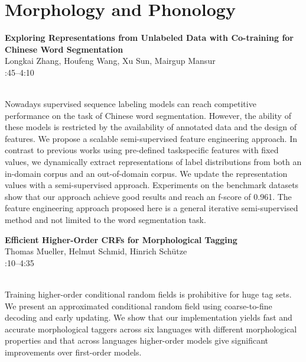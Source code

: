 \documentclass[twoside,makeidx]{book}
\renewcommand{\normalsize}{\fontsize{8}{9}\selectfont}
\renewcommand{\small}{\fontsize{7}{8}\selectfont}
\begin{document}
\section{Morphology and Phonology}
\vspace{-1em}
\par\vspace{2em}\noindent%
\begin{minipage}{\linewidth}%
\begin{center}
\textbf{\normalsize Exploring Representations from Unlabeled Data with Co-training for Chinese Word Segmentation}\\
\normalsize  Longkai Zhang,  Houfeng Wang,  Xu Sun,  Mairgup Mansur\\
{\small 3:45--4:10}\\
\end{center}
\end{minipage}\\[0.5em]
\nopagebreak%
\noindent%
{\small Nowadays supervised sequence labeling models can reach competitive performance on the task of Chinese word segmentation. However, the ability of these models is restricted by the availability of annotated data and the design of features. We propose a scalable semi-supervised feature engineering approach. In contrast to previous works using pre-defined taskspecific features with fixed values, we dynamically extract representations of label distributions from both an in-domain corpus and an out-of-domain corpus. We update the representation values with a semi-supervised approach. Experiments on the benchmark datasets show that our approach achieve good results and reach an f-score of 0.961. The feature engineering approach proposed here is a general iterative semi-supervised method and not limited to the word segmentation task.}
\par\vspace{2em}\noindent%
\begin{minipage}{\linewidth}%
\begin{center}
\textbf{\normalsize Efficient Higher-Order CRFs for Morphological Tagging}\\
\normalsize  Thomas Mueller,  Helmut Schmid,  Hinrich Sch\"{u}tze\\
{\small 4:10--4:35}\\
\end{center}
\end{minipage}\\[0.5em]
\nopagebreak%
\noindent%
{\small Training higher-order conditional random fields is prohibitive for huge tag sets. We present an approximated conditional random field using coarse-to-fine decoding and early updating. We show that our implementation yields fast and accurate morphological taggers across six languages with different morphological properties and that across languages higher-order models give significant improvements over first-order models.}
\end{document}
